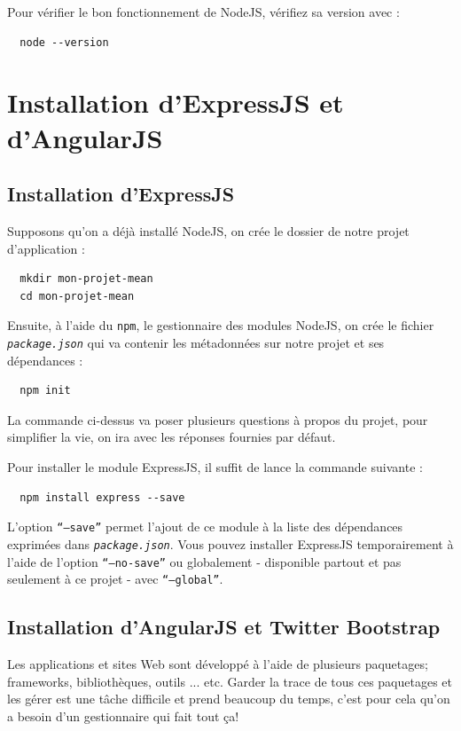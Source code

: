 \documentclass[a4paper,11pt,oneside]{report}
\begin{document}
\begin{appendices}
Pour vérifier le bon fonctionnement de NodeJS, vérifiez sa version avec :
  \begin{verbatim}
  node --version
  \end{verbatim}
\newpage

\section{Installation d'ExpressJS et d'AngularJS}

\subsection{Installation d'ExpressJS}
Supposons qu'on a déjà installé NodeJS, on crée le dossier de notre projet d'application :
  \begin{verbatim}
  mkdir mon-projet-mean
  cd mon-projet-mean
  \end{verbatim}

Ensuite, à l'aide du \texttt{npm}, le gestionnaire des modules NodeJS, on crée le fichier \texttt{\emph{package.json}} qui va contenir les métadonnées sur notre projet et ses dépendances :
  \begin{verbatim}
  npm init
  \end{verbatim}
La commande ci-dessus va poser plusieurs questions à propos du projet, pour simplifier la vie, on ira avec les réponses fournies par défaut.

Pour installer le module ExpressJS, il suffit de lance la commande suivante :
  \begin{verbatim}
  npm install express --save
  \end{verbatim}
L'option \texttt{``---save''} permet l'ajout de ce module à la liste des dépendances exprimées dans \texttt{\emph{package.json}}. Vous pouvez installer ExpressJS temporairement à l'aide de l'option \texttt{``---no-save''} ou globalement - disponible partout et pas seulement à ce projet - avec \texttt{``---global''}.

\subsection{Installation d'AngularJS et Twitter Bootstrap}
Les applications et sites Web sont développé à l'aide de plusieurs paquetages; frameworks, bibliothèques, outils ... etc. Garder la trace de tous ces paquetages et les gérer est une tâche difficile et prend beaucoup du temps, c'est pour cela qu'on a besoin d'un gestionnaire qui fait tout ça!


\end{appendices}
\end{document}
